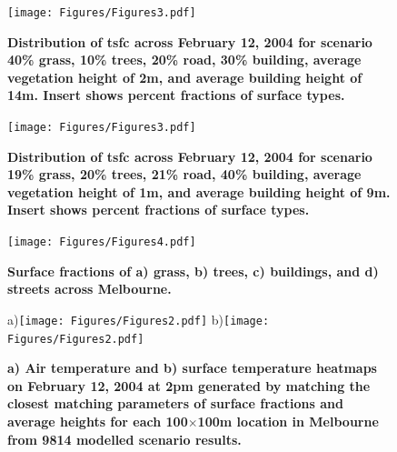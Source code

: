 \documentclass[final,3p,times,authoryear]{elsarticle}
\begin{document}
\begin{figure}
\centering
\texttt{[image: Figures/Figures3.pdf]}
\caption{\bf Distribution of \gls{tsfc} across February 12, 2004 for scenario 40\% grass, 10\% trees, 20\% road, 30\% building, average vegetation height of 2m, and average building height of 14m. Insert shows percent fractions of surface types.}
 \label{fig:dist6}
\end{figure}

\begin{figure}
\centering
\texttt{[image: Figures/Figures3.pdf]}
\caption{\bf Distribution of \gls{tsfc} across February 12, 2004 for scenario 19\% grass, 20\% trees, 21\% road, 40\% building, average vegetation height of 1m, and average building height of 9m. Insert shows percent fractions of surface types.}
 \label{fig:dist7}
\end{figure}


\begin{figure}
\centering
\texttt{[image: Figures/Figures4.pdf]}
\caption{\bf Surface fractions of a) grass, b) trees, c) buildings, and d) streets across Melbourne.}
 \label{fig:melfracs}
\end{figure}

\begin{figure}
\centering
a)\texttt{[image: Figures/Figures2.pdf]}
b)\texttt{[image: Figures/Figures2.pdf]}
\caption{\bf a) Air temperature and b) surface temperature heatmaps on February 12, 2004 at 2pm generated by matching the closest matching parameters of surface fractions and average heights for each 100$\times$100m location in Melbourne from 9814 modelled scenario results.  }
 \label{fig:TaMelb}
\end{figure}





\end{document}

